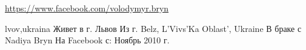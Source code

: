  
 
 
 
 

\url{https://www.facebook.com/volodymyr.bryn}\par
lvov,ukraina
Живет в г. Львов
Из г. Belz, L'Vivs'Ka Oblast', Ukraine
В браке с Nadiya Bryn
На Facebook с: Ноябрь 2010 г.

